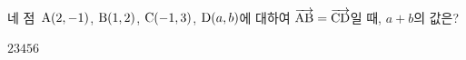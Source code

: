 네 점~$\mathrm{A}(2{,}\mkern3mu\mathopen{}-1)$, $\mathrm{B}(1{,}\mkern3mu\mathopen{}2)$, $\mathrm{C}(-1{,}\mkern3mu\mathopen{}3)$, $\mathrm{D}(a{,}\mkern3mu\mathopen{}b)$에 대하여 $\overrightarrow{\mathrm{AB}}=\overrightarrow{\mathrm{CD}}$일 때, $a+b$의 값은?
\begin{choices32}{$2$}{$3$}{$4$}{$5$}{$6$}\end{choices32}
